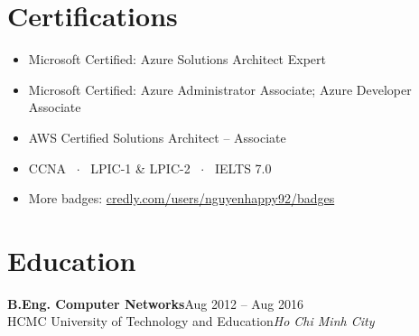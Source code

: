 \documentclass[a4paper,10pt]{article}
\newcommand{\role}[4]{%
  \textbf{#1}\hfill{\color{muted}\small #3}\\[1pt]
  {\color{accent}#2}\hfill{\color{muted}\small\textit{#4}}\par\vspace{3pt}}
\begin{document}
\section{Certifications}
\begin{itemize}
  \item Microsoft Certified: Azure Solutions Architect Expert
  \item Microsoft Certified: Azure Administrator Associate; Azure Developer Associate
  \item AWS Certified Solutions Architect -- Associate
  \item CCNA \, $\cdot$ \, LPIC-1 \& LPIC-2 \, $\cdot$ \, IELTS 7.0
  \item More badges: \href{https://www.credly.com/users/nguyenhappy92/badges}{credly.com/users/nguyenhappy92/badges}
\end{itemize}

\section{Education}
\role{B.Eng. Computer Networks}{HCMC University of Technology and Education}{Aug 2012 -- Aug 2016}{Ho Chi Minh City}
\end{document}
